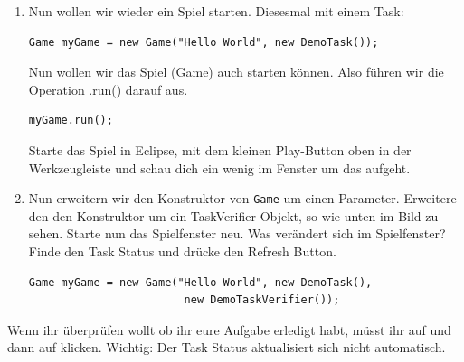 

\begin{enumerate}
    \item Nun wollen wir wieder ein Spiel starten. Diesesmal mit einem Task:

    \begin{lstlisting}
Game myGame = new Game("Hello World", new DemoTask());
    \end{lstlisting}

    Nun wollen wir das Spiel (Game) auch starten können. Also führen wir die Operation .run() darauf aus.

    \begin{lstlisting}
myGame.run();
    \end{lstlisting}

    Starte das Spiel in Eclipse, mit dem kleinen Play-Button oben in der Werkzeugleiste und schau dich ein wenig im Fenster um das aufgeht.

    \item Nun erweitern wir den Konstruktor von \texttt{Game} um einen Parameter. Erweitere den den Konstruktor um ein TaskVerifier Objekt, so wie unten im Bild zu sehen. Starte nun das Spielfenster neu. Was verändert sich im Spielfenster? Finde den Task Status und drücke den Refresh Button.

    \begin{lstlisting}
Game myGame = new Game("Hello World", new DemoTask(),
                        new DemoTaskVerifier());
    \end{lstlisting}

    \end{enumerate}
    \begin{Infobox}
    Wenn ihr überprüfen wollt ob ihr eure Aufgabe erledigt habt, müsst ihr auf  und dann auf  klicken.
    Wichtig: Der Task Status aktualisiert sich nicht automatisch.
    \end{Infobox}

